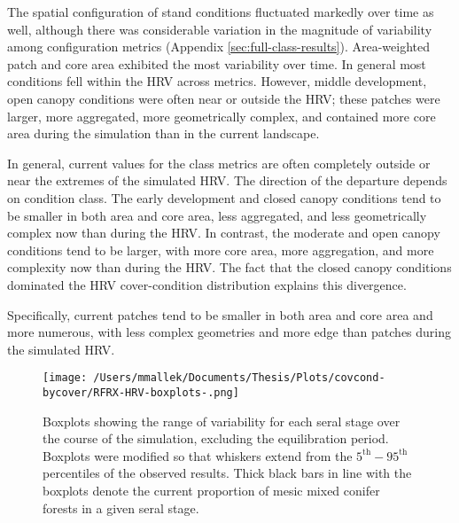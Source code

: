 The spatial configuration of stand conditions fluctuated markedly over time as well, although there was considerable variation in the magnitude of variability among configuration metrics (Appendix \ref{sec:full-class-results}). Area-weighted patch and core area exhibited the most variability over time. In general most conditions fell within the HRV across metrics. However, middle development, open canopy conditions were often near or outside the HRV; these patches were larger, more aggregated, more geometrically complex, and contained more core area during the simulation than in the current landscape.


In general, current values for the class metrics are often completely outside or near the extremes of the simulated HRV. The direction of the departure depends on condition class. The early development and closed canopy conditions tend to be smaller in both area and core area, less aggregated, and less geometrically complex now than during the HRV. In contrast, the moderate and open canopy conditions tend to be larger, with more core area, more aggregation, and more complexity now than during the HRV. The fact that the closed canopy conditions dominated the HRV cover-condition distribution explains this divergence.

Specifically, current patches tend to be smaller in both area and core area and more numerous, with less complex geometries and more edge than patches during the simulated HRV.

\begin{figure}[!htbp]
  \centering
    \texttt{[image: /Users/mmallek/Documents/Thesis/Plots/covcond-bycover/RFRX-HRV-boxplots-.png]}
  \caption{Boxplots showing the range of variability for each seral stage over the course of the simulation, excluding the equilibration period. Boxplots were modified so that whiskers extend from the $5^{\text{th}} - 95^{\text{th}}$ percentiles of the observed results. Thick black bars in line with the boxplots denote the current proportion of mesic mixed conifer forests in a given seral stage.} 
  \label{fig:covcond_rfrx_boxplots}
\end{figure}

